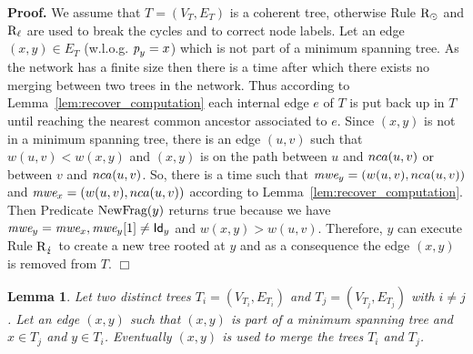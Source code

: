 \documentclass[11pt,a4paper]{article}
\newtheorem{lemma}{Lemma}
\newenvironment{proof}{\noindent \begin{rm}{\textbf{Proof.} }}{\hspace*{\fill}$\Box$\par\end{rm}}
\newcommand{\id}{\mbox{\sf Id}}
\newcommand{\parent}{\mbox{\it p}}
\newcommand{\m}{\mbox{\it mwe}}
\newcommand{\NewFragment}{\mbox{\rm NewFrag}}
\newcommand{\Lca}{\mbox{\rm $nca$}}
\newcommand{\RRoot}{\mbox{\rm R$_{\odot}$}} 	\newcommand{\RRLC}{\mbox{\rm R$_{\ell_{\odot}}$}}\newcommand{\RLC}{\mbox{\rm R$_{\ell}$}} \newcommand{\RMin}{\mbox{\rm R$_{Min}$}}
\newcommand{\RC}{\mbox{\rm R$_{\lightning}$}} \newcommand{\RReo}{\mbox{\rm R$_{\downarrow}$}}
\begin{document}
\begin{proof}
We assume that $T=(V_T,E_T)$ is a coherent tree, otherwise Rule $\RRoot$ and $\RLC$ are used to break the cycles and to correct node labels. Let an edge $(x,y) \in E_T$ (w.l.o.g. $\parent_y=x$) which is not part of a minimum spanning tree. As the network has a finite size then there is a time after which there exists no merging between two trees in the network. Thus according to Lemma~\ref{lem:recover_computation} each internal edge $e$ of $T$ is put back up in $T$ until reaching the nearest common ancestor associated to $e$. Since $(x,y)$ is not in a minimum spanning tree, there is an edge $(u,v)$ such that $w(u,v)<w(x,y)$ and $(x,y)$ is on the path between $u$ and $\Lca(u,v)$ or between $v$ and $\Lca(u,v)$. So, there is a time such that $\m_y=(w(u,v),\Lca(u,v))$ and $\m_x=(w(u,v),\Lca(u,v))$ according to Lemma~\ref{lem:recover_computation}. Then Predicate $\NewFragment(y)$ returns true because we have $\m_y=\m_x, \m_y[1]\neq \id_y$ and $w(x,y)>w(u,v)$. Therefore, $y$ can execute Rule $\RC$ to create a new tree rooted at $y$ and as a consequence the edge $(x,y)$ is removed from $T$.
\end{proof}

\begin{lemma}
\label{lem:merging_start}
Let two distinct trees $T_i=(V_{T_i},E_{T_i})$ and $T_j=(V_{T_j},E_{T_j})$ with $i\neq  j$. Let an edge $(x,y)$ such that $(x,y)$ is part of a minimum spanning tree and $x \in T_j$ and $y \in T_i$. Eventually $(x,y)$ is used to merge the trees $T_i$ and $T_j$.
\end{lemma}
\end{document}
